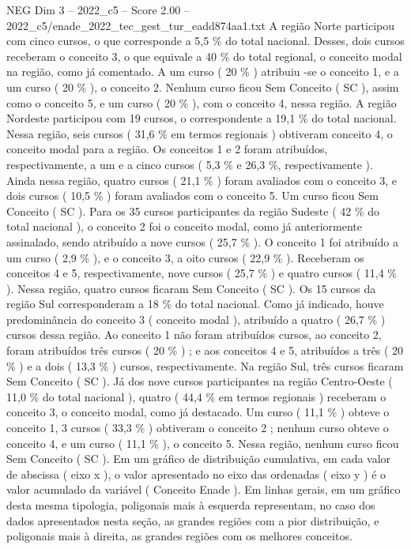 \begin{textsample}{NEG Dim 3 – 2022\_c5 – Score 2.00 – 2022\_c5/enade\_2022\_tec\_gest\_tur\_eadd874aa1.txt}
A região Norte participou com cinco cursos, o que corresponde a 5,5 \% do total nacional.
Desses, dois cursos receberam o conceito 3, o que equivale a 40 \% do total regional, o conceito modal na região, como já comentado.
A um curso ( 20 \% ) atribuiu -se o conceito 1, e a um curso ( 20 \% ), o conceito 2.
Nenhum curso ficou Sem Conceito ( SC ), assim como o conceito 5, e um curso ( 20 \% ), com o conceito 4, nessa região.
A região Nordeste participou com 19 cursos, o correspondente a 19,1 \% do total nacional.
Nessa região, seis cursos ( 31,6 \% em termos regionais ) obtiveram conceito 4, o conceito modal para a região.
Os conceitos 1 e 2 foram atribuídos, respectivamente, a um e a cinco cursos ( 5,3 \% e 26,3 \%, respectivamente ).
Ainda nessa região, quatro cursos ( 21,1 \% ) foram avaliados com o conceito 3, e dois cursos ( 10,5 \% ) foram avaliados com o conceito 5.
Um curso ficou Sem Conceito ( SC ).
Para os 35 cursos participantes da região Sudeste ( 42 \% do total nacional ), o conceito 2 foi o conceito modal, como já anteriormente assinalado, sendo atribuído a nove cursos ( 25,7 \% ).
O conceito 1 foi atribuído a um curso ( 2,9 \% ), e o conceito 3, a oito cursos ( 22,9 \% ).
Receberam os conceitos 4 e 5, respectivamente, nove cursos ( 25,7 \% ) e quatro cursos ( 11,4 \% ).
Nessa região, quatro cursos ficaram Sem Conceito ( SC ).
Os 15 cursos da região Sul corresponderam a 18 \% do total nacional.
Como já indicado, houve predominância do conceito 3 ( conceito modal ), atribuído a quatro ( 26,7 \% ) cursos dessa região.
Ao conceito 1 não foram atribuídos cursos, ao conceito 2, foram atribuídos três cursos ( 20 \% ) ; e aos conceitos 4 e 5, atribuídos a três ( 20 \% ) e a dois ( 13,3 \% ) cursos, respectivamente.
Na região Sul, três cursos ficaram Sem Conceito ( SC ).
Já dos nove cursos participantes na região Centro-Oeste ( 11,0 \% do total nacional ), quatro ( 44,4 \% em termos regionais ) receberam o conceito 3, o conceito modal, como já destacado.
Um curso ( 11,1 \% ) obteve o conceito 1, 3 cursos ( 33,3 \% ) obtiveram o conceito 2 ; nenhum curso obteve o conceito 4, e um curso ( 11,1 \% ), o conceito 5.
Nessa região, nenhum curso ficou Sem Conceito ( SC ).
Em um gráfico de distribuição cumulativa, em cada valor de abscissa ( eixo x ), o valor apresentado no eixo das ordenadas ( eixo y ) é o valor acumulado da variável ( Conceito Enade ).
Em linhas gerais, em um gráfico desta mesma tipologia, poligonais mais à esquerda representam, no caso dos dados apresentados nesta seção, as grandes regiões com a pior distribuição, e poligonais mais à direita, as grandes regiões com os melhores conceitos.

\end{textsample}
